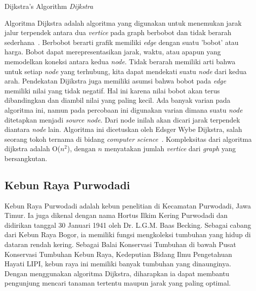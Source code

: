 \documentclass[conference]{IEEEtran}
\begin{document}
\begin{algorithm}[!ht]
\begin{center}
{\begin{minipage}{1\linewidth}
 		
 		\caption{Dijkstra’s Algorithm \textit{Dijkstra}}

    		 \end{minipage}
  		  } 		
  	  \end{center}
  		    
	\end{algorithm}

	Algoritma Dijkstra adalah algoritma yang digunakan untuk menemukan jarak jalur terpendek antara dua \textit{vertice} pada graph berbobot dan tidak berarah sederhana~\cite{ref2}. Berbobot berarti grafik memiliki \textit{edge} dengan suatu ’bobot’ atau harga. Bobot dapat merepresentasikan jarak, waktu, atau apapun yang memodelkan koneksi antara kedua \textit{node}. Tidak berarah memiliki arti bahwa untuk setiap \textit{node} yang terhubung, kita dapat mendekati suatu \textit{node} dari kedua arah. Pendekatan Dijikstra juga memiliki asumsi bahwa bobot pada \textit{edge} memiliki nilai yang tidak negatif. Hal ini karena nilai bobot akan terus dibandingkan dan diambil nilai yang paling kecil. Ada banyak varian pada algoritma ini, namun pada percobaan ini digunakan varian dimana suatu \textit{node} ditetapkan menjadi \textit{source node}. Dari node inilah akan dicari jarak terpendek diantara \textit{node} lain. Algoritma ini dicetuskan oleh Edsger Wybe Dijkstra, salah seorang tokoh ternama di bidang \textit{computer science}~\cite{ref3}. Kompleksitas dari algoritma dijkstra adalah O(\begin{math} n^2 \end{math}), dengan \begin{math} n \end{math} menyatakan jumlah \textit{vertice} dari \textit{graph} yang bersangkutan.

	\subsection{Kebun Raya Purwodadi}
	Kebun Raya Purwodadi adalah kebun penelitian di Kecamatan Purwodadi, Jawa Timur. Ia juga dikenal dengan nama Hortus Ilkim Kering Purwodadi dan didirikan tanggal 30 Januari 1941 oleh Dr. L.G.M. Baas Becking. Sebagai cabang dari Kebun Raya Bogor, ia memiliki fungsi mengkoleksi tumbuhan yang hidup di dataran rendah kering. Sebagai Balai Konservasi Tumbuhan di bawah Pusat Konservasi Tumbuhan Kebun Raya, Kedeputian Bidang Ilmu Pengetahuan Hayati LIPI, kebun raya ini memiliki banyak tumbuhan yang dinaunginya. Dengan menggunakan algoritma Dijkstra, diharapkan ia dapat membantu pengunjung mencari tanaman tertentu maupun jarak yang paling optimal.
\end{document}
